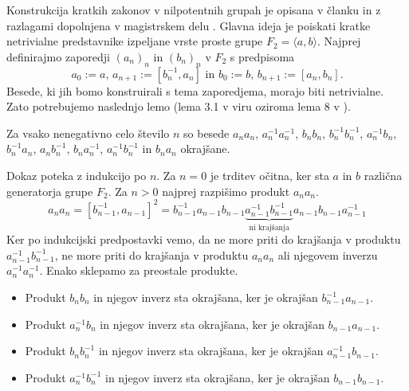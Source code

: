 Konstrukcija kratkih zakonov v nilpotentnih grupah je opisana v članku \cite{Elkasapy_Thom_2013} in z razlagami dopolnjena v magistrskem delu \cite{Schneider_2016}.
Glavna ideja je poiskati kratke netrivialne predstavnike izpeljane vrste proste grupe $F_2 = \langle a, b \rangle $. Najprej definirajmo zaporedji $(a_n)_n$ in $(b_n)_n$ v $F_2$ s predpisoma
\begin{equation*}
a_0 := a, \, a_{n + 1} := [b_n^{-1}, a_{n}] \text{ in } b_0 := b, \, b_{n + 1} := [a_{n}, b_{n}]. 
\end{equation*}  
Besede, ki jih bomo konstruirali s tema zaporedjema, morajo biti netrivialne. Zato potrebujemo naslednjo lemo (lema 3.1 v viru \cite{Kozma_Thom_2016} oziroma lema 8 v \cite{Schneider_2016}).
\begin{lema}
\label{lem_ni_krajsanj_produkti_ab}
Za vsako nenegativno celo število $n$ so besede $a_{n} a_{n}$, $a_{n}^{-1} a_{n}^{-1}$, $b_{n} b_{n}$, $b_{n}^{-1} b_{n}^{-1}$, $a_{n}^{-1} b_{n}$, $b_{n}^{-1} a_{n}$, $a_{n} b_{n}^{-1}$, $b_{n} a_{n}^{-1}$, $a_{n}^{-1} b_{n}^{-1}$ in $b_{n} a_{n}$ okrajšane.   
\end{lema}
\begin{dokaz}
    Dokaz poteka z indukcijo po $n$. Za $n = 0$ je trditev očitna, ker sta $a$ in $b$ različna generatorja grupe $F_2$. Za $n > 0$ najprej razpišimo produkt $a_n a_n$.
    \begin{equation*}
    a_{n} a_{n} = [b_{n- 1}^{-1}, a_{n-1}]^2 = b_{n- 1}^{-1} a_{n-1} b_{n- 1} \underbrace{a_{n-1}^{-1} b_{n- 1}^{-1}}_{\text{ni krajšanja}}  a_{n-1} b_{n- 1} a_{n-1}^{-1} 
    \end{equation*}  
    Ker po indukcijski predpostavki vemo, da ne more priti do krajšanja v produktu $a_{n -1}^{-1} b_{n -1}^{-1}$, ne more priti do krajšanja v produktu $a_{n} a_{n}$ ali njegovem inverzu $a_{n}^{-1} a_{n}^{-1}$. Enako sklepamo za preostale produkte.
    \begin{itemize}
        \item Produkt $b_{n} b_{n}$ in njegov inverz sta okrajšana, ker je okrajšan $b_{n - 1}^{-1} a_{n-1}.$
        \item Produkt $a_{n}^{-1} b_{n}$ in njegov inverz sta okrajšana, ker je okrajšan $b_{n - 1} a_{n-1}.$
        \item Produkt $b_{n} b_{n}^{-1}$ in njegov inverz sta okrajšana, ker je okrajšan $a_{n - 1}^{-1} b_{n-1}.$
        \item Produkt $a_{n}^{-1} b_{n}^{-1}$ in njegov inverz sta okrajšana, ker je okrajšan $b_{n - 1} b_{n-1}.$
    \end{itemize}     
\end{dokaz}


